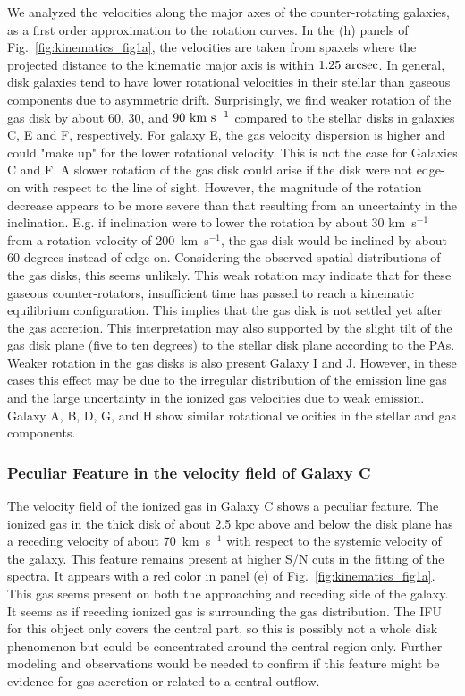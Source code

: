\documentclass[fleqn,usenatbib]{mnras}
\begin{document}
We analyzed the velocities along the major axes of the counter-rotating galaxies, as a first order approximation to the rotation curves.
In the (h) panels of Fig.~\ref{fig:kinematics_fig1a},
the velocities are taken from spaxels where the projected distance to the kinematic major axis is within $\rm 1.25~arcsec$. In general, disk galaxies tend to have lower rotational velocities in their stellar than gaseous components due to asymmetric drift. Surprisingly, 
we find weaker rotation of the gas disk by about 
60, 30, and $\rm 90~km~s^{-1}$ compared to 
the stellar disks in galaxies C, E and F, respectively. 
For galaxy E, the gas velocity dispersion is higher and could "make up" for the lower rotational velocity. This is not the case for Galaxies C and F. A slower rotation of the gas disk could arise 
if the disk were not edge-on with respect to the line of sight. 
However, the magnitude of the rotation decrease appears 
to be more severe than that resulting from an uncertainty in the inclination. 
E.g. if inclination were to lower the rotation by about 30 km~s$^{-1}$ from a rotation velocity of 200~km~s$^{-1}$, the gas disk would be inclined by about 60  degrees instead of edge-on. 
Considering the observed spatial distributions of the gas disks, 
this seems unlikely. This weak rotation may indicate 
that for these gaseous counter-rotators, insufficient  
time has passed to reach a kinematic equilibrium configuration.
This implies that the gas disk is not settled yet
after the gas accretion.
This interpretation may also supported by the slight tilt 
of the gas disk plane (five to ten degrees) 
to the stellar disk plane according to the PAs.
Weaker rotation in the gas disks 
is also present Galaxy I and J. 
However, in these cases this effect may be due to the irregular distribution of the emission line gas and the large uncertainty
in the ionized gas velocities due to weak emission.
Galaxy A, B, D, G, and H show similar rotational velocities
in the stellar and gas components.


\subsubsection{Peculiar Feature in the velocity field of Galaxy C}
\label{sec:Peculiar_Galaxy_C}

The velocity field of the ionized gas in Galaxy C shows 
a peculiar feature. The ionized gas in the thick disk of about 2.5 kpc above and below the disk plane
has a receding velocity of about 70~km~s$^{-1}$ with respect to the systemic velocity of the galaxy. This feature remains present at higher S/N cuts in the fitting of the spectra.
It appears with a red color in panel (e) of Fig.~\ref{fig:kinematics_fig1a}. 
This gas seems present on both the approaching and receding side of the galaxy. 
It seems as if receding ionized gas is surrounding the gas distribution. 
The IFU for this object only covers the central part, 
so this is possibly not a whole disk phenomenon but could be concentrated 
around the central region only. 
Further modeling and observations would be needed to confirm 
if this feature might be evidence for gas accretion or related to 
a central outflow. 
\end{document}
